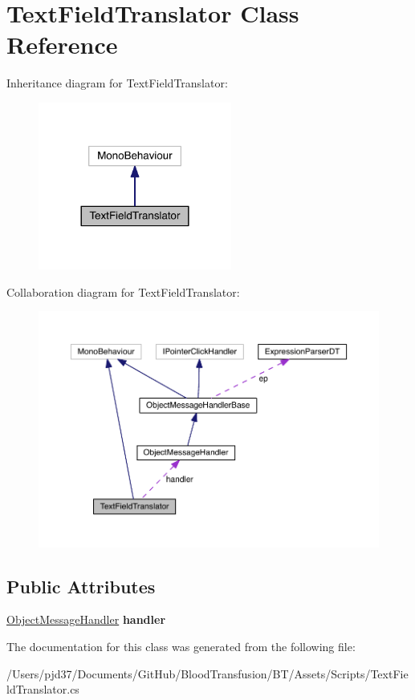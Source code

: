 \hypertarget{class_text_field_translator}{}\section{Text\+Field\+Translator Class Reference}
\label{class_text_field_translator}


Inheritance diagram for Text\+Field\+Translator\+:\nopagebreak
\begin{figure}[H]
\begin{center}
\leavevmode
\includegraphics[width=180pt]{class_text_field_translator__inherit__graph}
\end{center}
\end{figure}


Collaboration diagram for Text\+Field\+Translator\+:\nopagebreak
\begin{figure}[H]
\begin{center}
\leavevmode
\includegraphics[width=350pt]{class_text_field_translator__coll__graph}
\end{center}
\end{figure}
\subsection*{Public Attributes}
\begin{DoxyCompactItemize}
\item 
\hyperlink{class_object_message_handler}{Object\+Message\+Handler} {\bfseries handler}\hypertarget{class_text_field_translator_a98f85e312ce683c13df6af2e14c709af}{}\label{class_text_field_translator_a98f85e312ce683c13df6af2e14c709af}

\end{DoxyCompactItemize}


The documentation for this class was generated from the following file\+:\begin{DoxyCompactItemize}
\item 
/\+Users/pjd37/\+Documents/\+Git\+Hub/\+Blood\+Transfusion/\+B\+T/\+Assets/\+Scripts/Text\+Field\+Translator.\+cs\end{DoxyCompactItemize}
